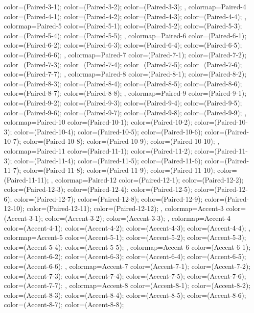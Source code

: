 {{  color=(Paired-3-1);
  color=(Paired-3-2);
  color=(Paired-3-3);
},
colormap={Paired-4}{
  color=(Paired-4-1);
  color=(Paired-4-2);
  color=(Paired-4-3);
  color=(Paired-4-4);
},
colormap={Paired-5}{
  color=(Paired-5-1);
  color=(Paired-5-2);
  color=(Paired-5-3);
  color=(Paired-5-4);
  color=(Paired-5-5);
},
colormap={Paired-6}{
  color=(Paired-6-1);
  color=(Paired-6-2);
  color=(Paired-6-3);
  color=(Paired-6-4);
  color=(Paired-6-5);
  color=(Paired-6-6);
},
colormap={Paired-7}{
  color=(Paired-7-1);
  color=(Paired-7-2);
  color=(Paired-7-3);
  color=(Paired-7-4);
  color=(Paired-7-5);
  color=(Paired-7-6);
  color=(Paired-7-7);
},
colormap={Paired-8}{
  color=(Paired-8-1);
  color=(Paired-8-2);
  color=(Paired-8-3);
  color=(Paired-8-4);
  color=(Paired-8-5);
  color=(Paired-8-6);
  color=(Paired-8-7);
  color=(Paired-8-8);
},
colormap={Paired-9}{
  color=(Paired-9-1);
  color=(Paired-9-2);
  color=(Paired-9-3);
  color=(Paired-9-4);
  color=(Paired-9-5);
  color=(Paired-9-6);
  color=(Paired-9-7);
  color=(Paired-9-8);
  color=(Paired-9-9);
},
colormap={Paired-10}{
  color=(Paired-10-1);
  color=(Paired-10-2);
  color=(Paired-10-3);
  color=(Paired-10-4);
  color=(Paired-10-5);
  color=(Paired-10-6);
  color=(Paired-10-7);
  color=(Paired-10-8);
  color=(Paired-10-9);
  color=(Paired-10-10);
},
colormap={Paired-11}{
  color=(Paired-11-1);
  color=(Paired-11-2);
  color=(Paired-11-3);
  color=(Paired-11-4);
  color=(Paired-11-5);
  color=(Paired-11-6);
  color=(Paired-11-7);
  color=(Paired-11-8);
  color=(Paired-11-9);
  color=(Paired-11-10);
  color=(Paired-11-11);
},
colormap={Paired-12}{
  color=(Paired-12-1);
  color=(Paired-12-2);
  color=(Paired-12-3);
  color=(Paired-12-4);
  color=(Paired-12-5);
  color=(Paired-12-6);
  color=(Paired-12-7);
  color=(Paired-12-8);
  color=(Paired-12-9);
  color=(Paired-12-10);
  color=(Paired-12-11);
  color=(Paired-12-12);
},
colormap={Accent-3}{
  color=(Accent-3-1);
  color=(Accent-3-2);
  color=(Accent-3-3);
},
colormap={Accent-4}{
  color=(Accent-4-1);
  color=(Accent-4-2);
  color=(Accent-4-3);
  color=(Accent-4-4);
},
colormap={Accent-5}{
  color=(Accent-5-1);
  color=(Accent-5-2);
  color=(Accent-5-3);
  color=(Accent-5-4);
  color=(Accent-5-5);
},
colormap={Accent-6}{
  color=(Accent-6-1);
  color=(Accent-6-2);
  color=(Accent-6-3);
  color=(Accent-6-4);
  color=(Accent-6-5);
  color=(Accent-6-6);
},
colormap={Accent-7}{
  color=(Accent-7-1);
  color=(Accent-7-2);
  color=(Accent-7-3);
  color=(Accent-7-4);
  color=(Accent-7-5);
  color=(Accent-7-6);
  color=(Accent-7-7);
},
colormap={Accent-8}{
  color=(Accent-8-1);
  color=(Accent-8-2);
  color=(Accent-8-3);
  color=(Accent-8-4);
  color=(Accent-8-5);
  color=(Accent-8-6);
  color=(Accent-8-7);
  color=(Accent-8-8);
}
}